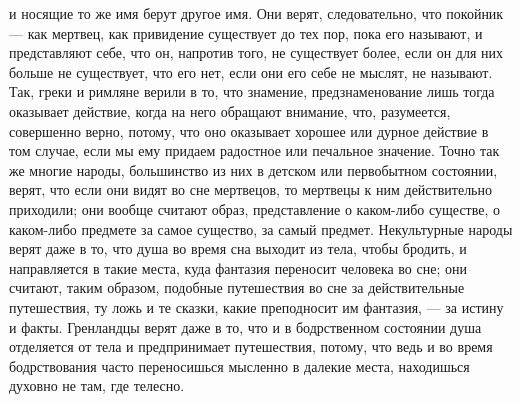 \documentclass[12pt]{article}
\begin{document}
и носящие то же имя берут другое имя. Они верят, следовательно, что покойник --- как мертвец, как привидение существует до тех пор, пока его называют, и представляют себе, что он, напротив того, не существует более, если он для них больше не существует, что его нет, если они его себе не мыслят, не называют. Так, греки и римляне верили в то, что знамение, предзнаменование лишь тогда оказывает действие, когда на него обращают внимание, что, разумеется, совершенно верно, потому, что оно оказывает хорошее или дурное действие в том случае, если мы ему придаем радостное или печальное значение. Точно так же многие народы, большинство из них в детском или первобытном состоянии, верят, что если они видят во сне мертвецов, то мертвецы к ним действительно приходили; они вообще считают образ, представление о каком-либо существе, о каком-либо предмете за самое существо, за самый предмет. Некультурные народы верят даже в то, что душа во время сна выходит из тела, чтобы бродить, и направляется в такие места, куда фантазия переносит человека во сне; они считают, таким образом, подобные путешествия во сне за действительные путешествия, ту ложь и те сказки, какие преподносит им фантазия, --- за истину и факты. Гренландцы верят даже в то, что и в бодрственном состоянии душа отделяется от тела и предпринимает путешествия, потому, что ведь и во время бодрствования часто переносишься мысленно в далекие места, находишься духовно не там, где телесно. 
\end{document}
